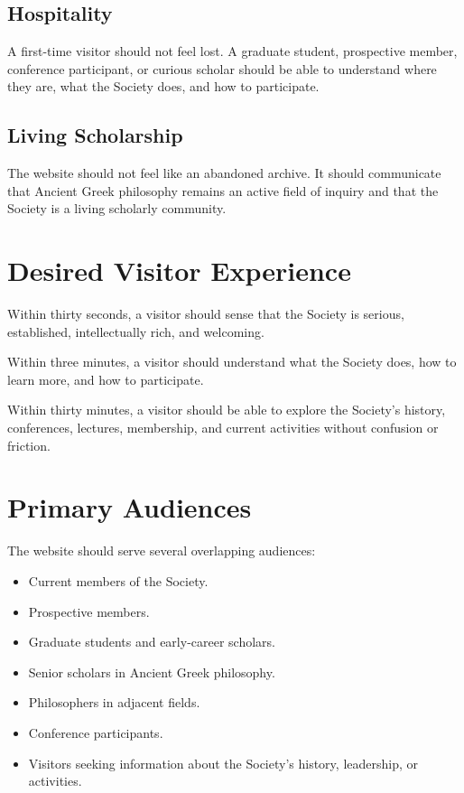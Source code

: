 \documentclass[11pt]{article}
\begin{document}
\subsection{Hospitality}

A first-time visitor should not feel lost. A graduate student, prospective member, conference participant, or curious scholar should be able to understand where they are, what the Society does, and how to participate.

\subsection{Living Scholarship}

The website should not feel like an abandoned archive. It should communicate that Ancient Greek philosophy remains an active field of inquiry and that the Society is a living scholarly community.

\section{Desired Visitor Experience}

Within thirty seconds, a visitor should sense that the Society is serious, established, intellectually rich, and welcoming.

Within three minutes, a visitor should understand what the Society does, how to learn more, and how to participate.

Within thirty minutes, a visitor should be able to explore the Society's history, conferences, lectures, membership, and current activities without confusion or friction.

\section{Primary Audiences}

The website should serve several overlapping audiences:

\begin{itemize}[leftmargin=2em]
    \item Current members of the Society.
    \item Prospective members.
    \item Graduate students and early-career scholars.
    \item Senior scholars in Ancient Greek philosophy.
    \item Philosophers in adjacent fields.
    \item Conference participants.
    \item Visitors seeking information about the Society's history, leadership, or activities.
\end{itemize}
\end{document}
